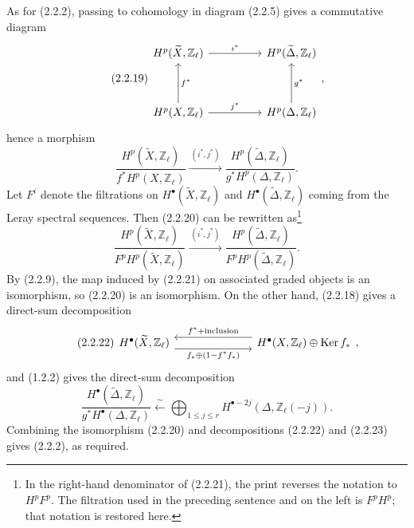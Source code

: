 As for (2.2.2), passing to cohomology in diagram (2.2.5) gives a
commutative diagram
\begin{equation}\tag{2.2.19}
\begin{tikzcd}[row sep=huge,column sep=huge]
H^p(\widetilde X,\mathbb Z_\ell)
  \arrow[r,"i^*"]
&
H^p(\widetilde\Delta,\mathbb Z_\ell)
\\
H^p(X,\mathbb Z_\ell)
  \arrow[r,"j^*"]
  \arrow[u,"f^*"']
&
H^p(\Delta,\mathbb Z_\ell)
  \arrow[u,"g^*"']
\end{tikzcd},
\end{equation}
hence a morphism
\begin{equation}\tag{2.2.20}
\frac{H^p(\widetilde X,\mathbb Z_\ell)}
     {f^*H^p(X,\mathbb Z_\ell)}
\xrightarrow{\ (i^*,j^*)\ }
\frac{H^p(\widetilde\Delta,\mathbb Z_\ell)}
     {g^*H^p(\Delta,\mathbb Z_\ell)}.
\end{equation}
Let $F^i$ denote the filtrations on
$H^\bullet(\widetilde X,\mathbb Z_\ell)$ and
$H^\bullet(\widetilde\Delta,\mathbb Z_\ell)$ coming from the Leray spectral
sequences. Then (2.2.20) can be rewritten as\footnote{In the right-hand
denominator of (2.2.21), the print reverses the notation to $H^pF^p$.
The filtration used in the preceding sentence and on the left is
$F^pH^p$; that notation is restored here.}
\begin{equation}\tag{2.2.21}
\frac{H^p(\widetilde X,\mathbb Z_\ell)}
     {F^pH^p(\widetilde X,\mathbb Z_\ell)}
\xrightarrow{\ (i^*,j^*)\ }
\frac{H^p(\widetilde\Delta,\mathbb Z_\ell)}
     {F^pH^p(\widetilde\Delta,\mathbb Z_\ell)}.
\end{equation}
By (2.2.9), the map induced by (2.2.21) on associated graded objects is an
isomorphism, so (2.2.20) is an isomorphism. On the other hand, (2.2.18) gives
a direct-sum decomposition
\begin{equation}\tag{2.2.22}
\begin{tikzcd}[column sep=7em]
H^\bullet(\widetilde X,\mathbb Z_\ell)
  \arrow[r,shift right=1.2ex,
    "f_*\oplus(1-f^*f_*)"']
&
H^\bullet(X,\mathbb Z_\ell)\oplus\Ker f_*
  \arrow[l,shift right=1.2ex,
    "f^*+\text{inclusion}"']
\end{tikzcd},
\end{equation}
and (1.2.2) gives the direct-sum decomposition
\begin{equation}\tag{2.2.23}
\frac{H^\bullet(\widetilde\Delta,\mathbb Z_\ell)}
     {g^*H^\bullet(\Delta,\mathbb Z_\ell)}
\xleftarrow{\ \sim\ }
\bigoplus_{1\leq j\leq r}
H^{\bullet-2j}(\Delta,\mathbb Z_\ell(-j)).
\end{equation}
Combining the isomorphism (2.2.20) and decompositions (2.2.22) and (2.2.23)
gives (2.2.2), as required.

